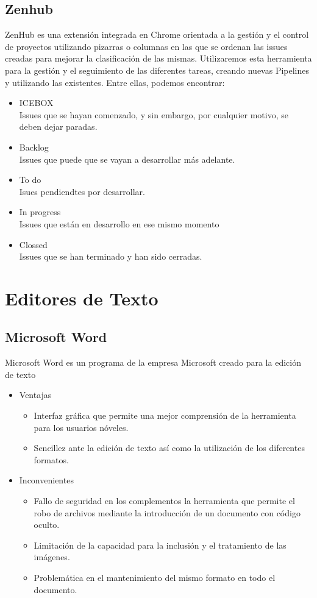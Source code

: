 \subsection{Zenhub}
ZenHub es una extensión integrada en Chrome orientada a la gestión y el control de proyectos utilizando pizarras o columnas en las que se ordenan las issues creadas para mejorar la clasificación de las mismas. 
Utilizaremos esta herramienta para la gestión y el seguimiento de las diferentes tareas, creando nuevas Pipelines  y utilizando las existentes. Entre ellas, podemos encontrar: 
\begin{itemize}
\item ICEBOX \\ Issues que se hayan comenzado, y sin embargo, por cualquier motivo, se deben dejar paradas. 
\item Backlog \\ Issues que puede que  se vayan a desarrollar más adelante.
\item To do \\Isues pendiendtes por desarrollar. 
\item In progress \\Issues que están en desarrollo en ese mismo momento
\item Clossed \\Issues que se han terminado y han sido cerradas. 
\end{itemize}
\section{Editores de Texto}
\subsection{Microsoft Word}
Microsoft Word es un programa de la empresa Microsoft creado para la edición de texto\cite{wiki:Word}
\begin{itemize}
\item Ventajas
\begin{itemize}
\item Interfaz gráfica que permite una mejor comprensión de la herramienta para los usuarios nóveles. \nocite{elblogdel1:Word}
\item Sencillez ante la edición de texto así como la utilización de los diferentes formatos.
\end{itemize}
\end{itemize}
\begin{itemize}
\item Inconvenientes
\begin{itemize}
\item Fallo de seguridad en los complementos la herramienta que permite el robo de archivos mediante la introducción de un documento con código oculto.\cite{monografias:Word}
\item Limitación de la capacidad para la inclusión y el tratamiento de las imágenes.
\item Problemática en el mantenimiento del mismo formato en todo el documento.
\end{itemize}
\end{itemize}
